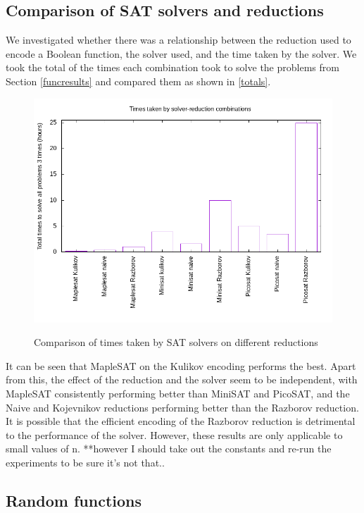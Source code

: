 \documentclass{article}
\begin{document}
\subsection{Comparison of SAT solvers and reductions} \label{satresults}

We investigated whether there was a relationship between the reduction used to encode a Boolean function, the solver used, and the time taken by the solver. We took the total of the times each combination took to solve the problems from Section \ref{funcresults} and compared them as shown in \ref{totals}.

\begin{figure}[!ht]
  \includegraphics[width=\textwidth]{images/totals.png}
  \label{fig:totals}
  \caption{Comparison of times taken by SAT solvers on different reductions}
\end{figure}

It can be seen that MapleSAT on the Kulikov encoding performs the best. Apart from this, the effect of the reduction and the solver seem to be independent, with MapleSAT consistently performing better than MiniSAT and PicoSAT, and the Naive and Kojevnikov reductions performing better than the Razborov reduction. It is possible that the efficient encoding of the Razborov reduction is detrimental to the performance of the solver. However, these results are only applicable to small values of n. **however I should take out the constants and re-run the experiments to be sure it’s not that..

\subsection{Random functions}\label{randomresults}
\end{document}
